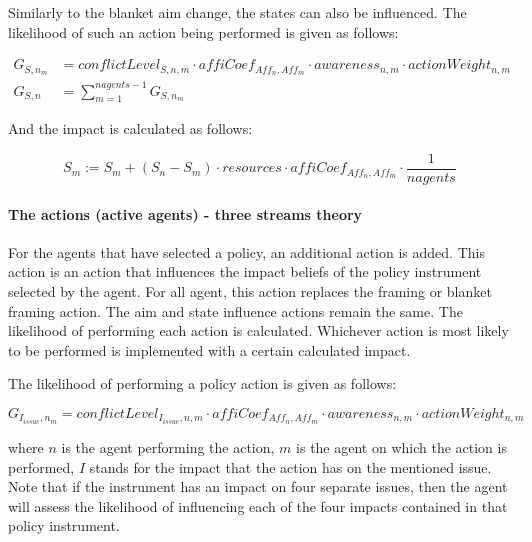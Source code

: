 Similarly to the blanket aim change, the states can also be influenced. The likelihood of such an action being performed is given as follows:

\begin{equation}\label{eq:likelihoodBlanketFraming2}\begin{split}
G_{S, n_m} &= conflictLevel_{S, n, m} \cdot affiCoef_{Aff_n,Aff_m} \cdot awareness_{n,m} \cdot actionWeight_{n,m}\\
G_{S, n} &= \sum_{m = 1}^{nagents-1} G_{S, n_m}
\end{split}\end{equation}

And the impact is calculated as follows:

\begin{equation}\label{eq:impactBlanketFraming2}
S_{m} := S_{m} + \left( S_{n} - S_{m} \right) \cdot resources \cdot affiCoef_{Aff_n,Aff_m} \cdot \frac{1}{nagents}
\end{equation}

\paragraph{The actions (active agents) - three streams theory}

For the agents that have selected a policy, an additional action is added. This action is an action that influences the impact beliefs of the policy instrument selected by the agent. For all agent, this action replaces the framing or blanket framing action. The aim and state influence actions remain the same. The likelihood of performing each action is calculated. Whichever action is most likely to be performed is implemented with a certain calculated impact.

The likelihood of performing a policy action is given as follows:

\begin{equation}\label{eq:likelihoodImpact2}
G_{I_{issue}, n_m} = conflictLevel_{I_{issue}, n, m} \cdot affiCoef_{Aff_n,Aff_m} \cdot awareness_{n,m} \cdot actionWeight_{n,m}
\end{equation}

where $n$ is the agent performing the action, $m$ is the agent on which the action is performed, $I$ stands for the impact that the action has on the mentioned issue. Note that if the instrument has an impact on four separate issues, then the agent will assess the likelihood of influencing each of the four impacts contained in that policy instrument.

